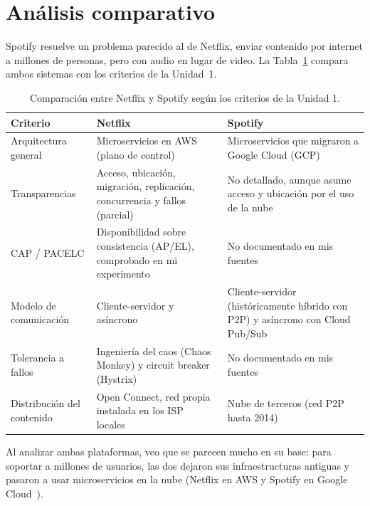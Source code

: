 \section{Análisis comparativo}

Spotify resuelve un problema parecido al de Netflix, enviar contenido por internet a millones de personas, pero con audio en lugar de video. La Tabla~\ref{tab:comparativo} compara ambos sistemas con los criterios de la Unidad~1.

\begin{table}[H]
  \centering
  \caption{Comparación entre Netflix y Spotify según los criterios de la Unidad 1.}
  \label{tab:comparativo}
  \small
  \begin{tabularx}{\textwidth}{>{\raggedright\arraybackslash}p{3.2cm} >{\raggedright\arraybackslash}X >{\raggedright\arraybackslash}X}
    \toprule
    Criterio & Netflix & Spotify \\
    \midrule
    Arquitectura general & Microservicios en AWS (plano de control)~\cite{Netflix_CloudMigration} & Microservicios que migraron a Google Cloud (GCP)~\cite{GoogleCloud_Spotify2016} \\
    Transparencias & Acceso, ubicación, migración, replicación, concurrencia y fallos (parcial) & No detallado, aunque asume acceso y ubicación por el uso de la nube \\
    CAP / PACELC & Disponibilidad sobre consistencia (AP/EL), comprobado en mi experimento & No documentado en mis fuentes \\
    Modelo de comunicación & Cliente-servidor y asíncrono~\cite{Rangarajan_PlayAPI} & Cliente-servidor (históricamente híbrido con P2P) y asíncrono con Cloud Pub/Sub~\cite{TechCrunch_Spotify2014,GoogleCloud_Spotify2016} \\
    Tolerancia a fallos & Ingeniería del caos (Chaos Monkey) y circuit breaker (Hystrix)~\cite{Owotogbe_2024,SpringCloudNetflix} & No documentado en mis fuentes \\
    Distribución del contenido & Open Connect, red propia instalada en los ISP locales~\cite{Netflix_OpenConnect} & Nube de terceros (red P2P hasta 2014)~\cite{TechCrunch_Spotify2014,GoogleCloud_Spotify2016} \\
    \bottomrule
  \end{tabularx}
\end{table}

Al analizar ambas plataformas, veo que se parecen mucho en su base: para soportar a millones de usuarios, las dos dejaron sus infraestructuras antiguas y pasaron a usar microservicios en la nube (Netflix en AWS y Spotify en Google Cloud~\cite{GoogleCloud_Spotify2016}).

